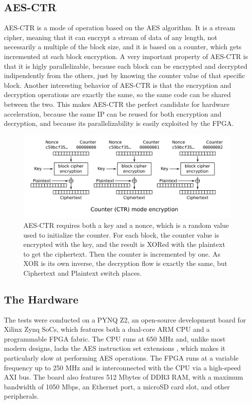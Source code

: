 \documentclass[12pt,oneside,a4paper]{article}
\begin{document}
\subsection{AES-CTR} \label{subsec:aes-ctr}
AES-CTR \cite{aes:ctr} is a mode of operation based on the AES algorithm. It is a stream cipher, meaning that it can encrypt a stream of data of any length, not necessarily a multiple of the block size, and it is based on a counter, which gets incremented at each block encryption.
A very important property of AES-CTR is that it is higly parallelizable, because each block can be encrypted and decrypted indipendently from the others, just by knowing the counter value of that specific block.
Another interesting behavior of AES-CTR is that the encryption and decryption operations are exactly the same, so the same code can be shared between the two.
This makes AES-CTR the perfect candidate for hardware acceleration, because the same IP can be reused for both encryption and decryption, and because its parallelizability is easily exploited by the FPGA.
\begin{figure}[h!]
	\centering
	\includegraphics[width=\textwidth]{CTR_encryption_scheme.png}
	\caption{AES-CTR requires both a key and a nonce, which is a random value used to initialize the counter. For each block, the counter value is encrypted with the key, and the result is XORed with the plaintext to get the ciphertext. Then the counter is incremented by one. As XOR is its own inverse, the decryption flow is exactly the same, but Ciphertext and Plaintext switch places. \cite{pic:aes-ctr}}
\end{figure}

\subsection{The Hardware} \label{subsec:the-hardware}
The tests were conducted on a PYNQ Z2, an open-source development board for Xilinx Zynq SoCs, which features both a dual-core ARM CPU and a programmable FPGA fabric.
The CPU runs at 650 MHz and, unlike most modern designs, lacks the AES instruction set extensions \cite {aes:arm-extensions}, which makes it particularly slow at performing AES operations.
The FPGA runs at a variable frequency up to 250 MHz and is interconnected with the CPU via a high-speed AXI bus.
The board also features 512 Mbytes of DDR3 RAM, with a maximum bandwidth of 1050 Mbps, an Ethernet port, a microSD card slot, and other peripherals.
\end{document}
